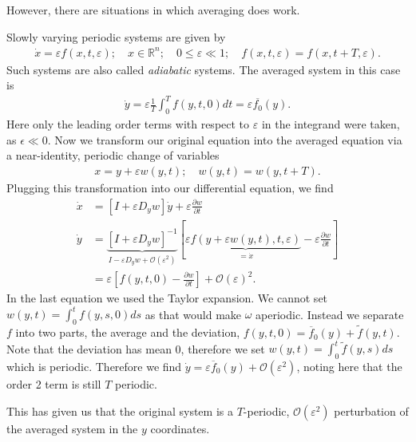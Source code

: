 However, there are situations in which averaging does work.
\begin{ex}
Slowly varying periodic systems are given by
\begin{align}
	\dot{x} = \varepsilon f(x, t, \varepsilon);\quad x \in \mathbb{R}^{n};\quad 0 \leq \varepsilon \ll 1;\quad f(x,t,\varepsilon) = f(x,t+T,\varepsilon).
\end{align}
Such systems are also called \emph{adiabatic} systems.
The averaged system in this case is
\begin{align}
	\dot{y} = \varepsilon \frac{1}{T} \int_{0}^{T} f(y,t,0)dt = \varepsilon \overline{f_0}(y).	
\end{align}
Here only the leading order terms with respect to $\varepsilon$ in the integrand were taken, as $\epsilon \ll 0$. Now we transform our original equation into the averaged equation via a near-identity, periodic change of variables
\begin{align}
	x=y+\varepsilon w(y,t);\quad w(y,t) = w(y, t+T).
\end{align}
Plugging this transformation into our differential equation, we find
\begin{subequations}
\begin{align}
	\dot{x} &= \left[ I + \varepsilon D_{y}w\right]\dot{y} + \varepsilon \frac{\partial w}{\partial t} \\
	\dot{y} & = \underbrace{\left[ I + \varepsilon D_{y}w \right] ^{-1}}_{I - \varepsilon D_yw + \mathcal{O}(\varepsilon^2)}
	\left[\varepsilon  \underbrace{f(y+\varepsilon w(y,t),t,\varepsilon)}_{=\dot{x}} -\varepsilon \frac{\partial w}{\partial t} \right]\\ 
		&=\varepsilon \left[f(y,t,0) - \frac{\partial w}{\partial t}\right] + \mathcal{O}(\varepsilon)^2.
\end{align}
\end{subequations}
In the last equation we used the Taylor expansion. We cannot set $w(y,t) = \int_{0}^{t} f(y,s,0)ds$ as that would make $\omega $ aperiodic. Instead we separate $f$ into two parts, the average and the deviation, $f(y,t,0) = \overline{f}_0 (y) + \tilde{f}(y,t)$. Note that the deviation has mean 0, therefore we set $w(y,t) = \int_{0}^{t} \tilde{f}(y,s)ds$ which is periodic. Therefore we find $\dot{y} = \varepsilon \overline{f}_0(y) + \mathcal{O}(\varepsilon^2)$, noting here that the order 2 term is still $T$ periodic. 

This has given us that the original system is a $T$-periodic, $\mathcal{O}(\varepsilon^2)$ perturbation of the averaged system in the $y$ coordinates. 
\end{ex}

